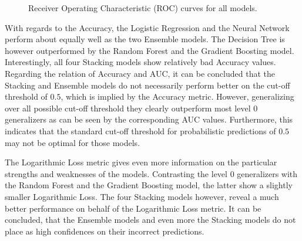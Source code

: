 \documentclass[12pt]{article}
\begin{document}
\begin{figure}[!htp] 
\caption[ROC curves]{Receiver Operating Characteristic (ROC) curves for all models.}\label{aucplot}
\end{figure} 


With regards to the Accuracy, the Logistic Regression and the Neural Network perform about equally well as the two Ensemble models. The Decision Tree is however outperformed by the Random Forest and the Gradient Boosting model. Interestingly, all four Stacking models show relatively bad Accuracy values. Regarding the relation of Accuracy and AUC, it can be concluded that the Stacking and Ensemble models do not necessarily perform better on the cut-off threshold of $0.5$, which is implied by the Accuracy metric. However, generalizing over all possible cut-off threshold they clearly outperform most level 0 generalizers as can be seen by the corresponding AUC values. Furthermore, this indicates that the standard cut-off threshold for probabilistic predictions of $0.5$ may not be optimal for those models.

The Logarithmic Loss metric gives even more information on the particular strengths and weaknesses of the models. Contrasting the level 0 generalizers with the Random Forest and the Gradient Boosting model, the latter show a slightly smaller Logarithmic Loss. The four Stacking models however, reveal a much better performance on behalf of the Logarithmic Loss metric. It can be concluded, that the Ensemble models and even more the Stacking models do not place as high confidences on their incorrect predictions. 
\end{document}
